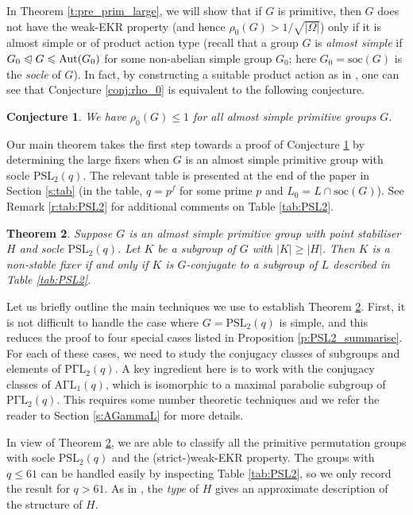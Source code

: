 \documentclass[twoside,a4paper,reqno,11pt]{amsart}
\newcommand{\normeq}{\trianglelefteqslant}
\newcommand{\<}{\langle}
\renewcommand{\>}{\rangle}
\newcommand{\leqs}{\leqslant}
\newcommand{\geqs}{\geqslant}
\newcommand{\Aut}{\mathrm{Aut}}
\newcommand{\soc}{\mathrm{soc}}
\newcommand{\PSL}{\mathrm{PSL}}
\newcommand{\PGammaL}{\mathrm{P\Gamma L}}
\newtheorem{theorem}{Theorem}
\newtheorem{conj}[theorem]{Conjecture}
\theoremstyle{definition}
\begin{document}
	In Theorem \ref{t:pre_prim_large}, we will show that if $G$ is primitive, then $G$ does not have the weak-EKR property (and hence $\rho_0(G) > 1/\sqrt{|\Omega|}$) only if it is almost simple or of product action type (recall that a group $G$ is  \textit{almost simple} if $G_0\normeq G\leqs \Aut(G_0)$ for some non-abelian simple group $G_0$; here $G_0 = \soc(G)$ is the \textit{socle} of $G$). In fact, by constructing a suitable product action as in \cite[Construction 3.2]{LPSX_intersecting}, one can see that Conjecture \ref{conj:rho_0} is equivalent to the following conjecture.
	
	\begin{conj}
		\label{conj:rho_0_as}
		We have $\rho_0(G) \leqs 1$ for all almost simple primitive groups $G$.
	\end{conj}
	
	Our main theorem takes the first step towards a proof of Conjecture \ref{conj:rho_0_as} by determining the large fixers when $G$ is an almost simple primitive group with socle $\PSL_2(q)$. The relevant table is presented at the end of the paper in Section \ref{s:tab} (in the table, $q = p^f$ for some prime $p$ and $L_0 = L\cap \soc(G)$). See Remark \ref{r:tab:PSL2} for additional comments on Table \ref{tab:PSL2}.
	
	\begin{theorem}
		\label{thm:PSL2}
		Suppose $G$ is an almost simple primitive group with point stabiliser $H$ and socle $\PSL_2(q)$. Let $K$ be a subgroup of $G$ with $|K|\geqs |H|$. Then $K$ is a non-stable fixer if and only if $K$ is $G$-conjugate to a subgroup of $L$ described in Table \ref{tab:PSL2}.
	\end{theorem}
	
	Let us briefly outline  the main techniques we use to establish Theorem \ref{thm:PSL2}. First, it is not difficult to handle the case where $G = \PSL_2(q)$ is simple, and this reduces the proof to four special cases listed in Proposition \ref{p:PSL2_summarise}. For each of these cases, we need to study the conjugacy classes of subgroups and elements of $\PGammaL_2(q)$. A key ingredient here is to work with the conjugacy classes of $\mathrm{A\Gamma L}_1(q)$, which is isomorphic to a maximal parabolic subgroup of $\PGammaL_2(q)$. This requires some number theoretic techniques and we refer the reader to Section \ref{s:AGammaL} for more details.
	
	In view of Theorem \ref{thm:PSL2}, we are able to classify all the primitive permutation groups with socle $\PSL_2(q)$ and the (strict-)weak-EKR property. The groups with $q\leqs 61$ can be handled easily by inspecting Table \ref{tab:PSL2}, so we only record the result for $q > 61$. As in \cite{KL_classical}, the \textit{type} of $H$ gives an approximate description of the structure of $H$.
	
\end{document}
